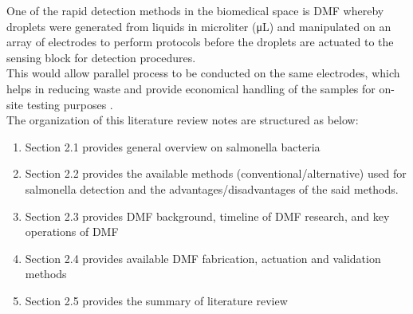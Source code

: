 One of the rapid detection methods in the biomedical space is DMF whereby droplets were generated from liquids in microliter (μL) and manipulated on an array of electrodes to perform protocols before the droplets are actuated to the sensing block for detection procedures.\\

This would allow parallel process to be conducted on the same electrodes, which helps in reducing waste and provide economical handling of the samples for on-site testing purposes \cite{agarwalDigitalMicrofluidicsTechniques2012}.\\

The organization of this literature review notes are structured as below:
\begin{enumerate}
    \item Section 2.1 provides general overview on salmonella bacteria
    \item Section 2.2 provides the available methods (conventional/alternative) used for salmonella detection and the advantages/disadvantages of the said methods.
    \item Section 2.3 provides DMF background, timeline of DMF research, and key operations of DMF
    \item Section 2.4 provides available DMF fabrication, actuation and validation methods
    \item Section 2.5 provides the summary of literature review
\end{enumerate}